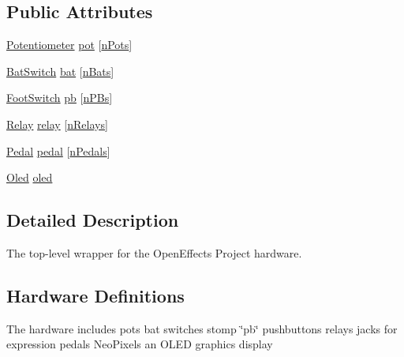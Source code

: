 \subsection*{Public Attributes}
\begin{DoxyCompactItemize}
\item 
\mbox{\hyperlink{class_potentiometer}{Potentiometer}} \mbox{\hyperlink{class_open_effects_box_h_w_a7f9ef97832b111faf82ba832cfa42fe6}{pot}} \mbox{[}\mbox{\hyperlink{_open_effects_box_h_w_8h_a352d1681e96241516bf636a810bd26d9}{n\+Pots}}\mbox{]}
\item 
\mbox{\hyperlink{class_bat_switch}{Bat\+Switch}} \mbox{\hyperlink{class_open_effects_box_h_w_a705b1a8313c014b390897bbc7a7a21a0}{bat}} \mbox{[}\mbox{\hyperlink{_open_effects_box_h_w_8h_a36382b6deaaa10e505e0426701830964}{n\+Bats}}\mbox{]}
\item 
\mbox{\hyperlink{class_foot_switch}{Foot\+Switch}} \mbox{\hyperlink{class_open_effects_box_h_w_a8d03d86b0d55c135f413a86fff56393c}{pb}} \mbox{[}\mbox{\hyperlink{_open_effects_box_h_w_8h_a66b2de1f056e3372214c3244690b509f}{n\+P\+Bs}}\mbox{]}
\item 
\mbox{\hyperlink{class_relay}{Relay}} \mbox{\hyperlink{class_open_effects_box_h_w_a106b87ae726618d5f816ad4e9cfe2cbc}{relay}} \mbox{[}\mbox{\hyperlink{_open_effects_box_h_w_8h_a6da04c873e299e44ccf5a2fe43f50ae1}{n\+Relays}}\mbox{]}
\item 
\mbox{\hyperlink{class_pedal}{Pedal}} \mbox{\hyperlink{class_open_effects_box_h_w_a1a6432eed1b73a5b3cbf18da9085beb1}{pedal}} \mbox{[}\mbox{\hyperlink{_open_effects_box_h_w_8h_a4fea7d8a44c63d401b302fd9ce5964bf}{n\+Pedals}}\mbox{]}
\item 
\mbox{\hyperlink{class_oled}{Oled}} \mbox{\hyperlink{class_open_effects_box_h_w_a567084cd766ac8fa8966e6b8f749f210}{oled}}
\end{DoxyCompactItemize}


\subsection{Detailed Description}
The top-\/level wrapper for the Open\+Effects Project hardware. 

\subsection*{Hardware Definitions}

The hardware includes pots bat switches stomp \char`\"{}pb\char`\"{} pushbuttons relays jacks for expression pedals Neo\+Pixels an O\+L\+ED graphics display

